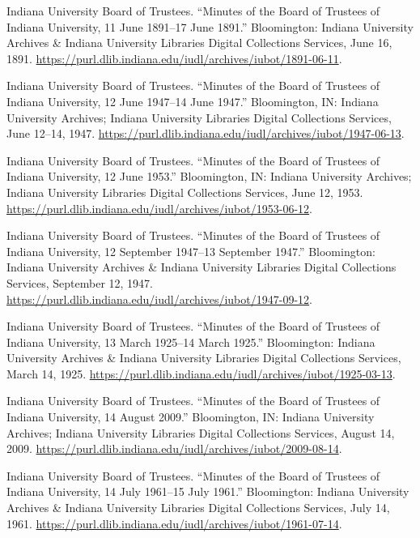 \documentclass[
  american,
  letterpaper,
]{scrreprt}
\newlength{\cslhangindent}
\newenvironment{CSLReferences}[2] %
 {\begin{list}{}{%
  \setlength{\itemindent}{0pt}
  \setlength{\leftmargin}{0pt}
  \setlength{\parsep}{0pt}
  \ifodd #1
   \setlength{\leftmargin}{\cslhangindent}
   \setlength{\itemindent}{-1\cslhangindent}
  \fi
  \setlength{\itemsep}{#2\baselineskip}}}
 {\end{list}}
\begin{document}
\begin{CSLReferences}{1}{0}
Indiana University Board of Trustees. {``Minutes of the Board of
Trustees of Indiana University, 11 June 1891--17 June 1891.''}
Bloomington: Indiana University Archives \& Indiana University Libraries
Digital Collections Services, June 16, 1891.
\url{https://purl.dlib.indiana.edu/iudl/archives/iubot/1891-06-11}.

Indiana University Board of Trustees. {``Minutes of the Board of
Trustees of Indiana University, 12 June 1947--14 June 1947.''}
Bloomington, IN: Indiana University Archives; Indiana University
Libraries Digital Collections Services, June 12--14, 1947.
\url{https://purl.dlib.indiana.edu/iudl/archives/iubot/1947-06-13}.

Indiana University Board of Trustees. {``Minutes of the Board of
Trustees of Indiana University, 12 June 1953.''} Bloomington, IN:
Indiana University Archives; Indiana University Libraries Digital
Collections Services, June 12, 1953.
\url{https://purl.dlib.indiana.edu/iudl/archives/iubot/1953-06-12}.

Indiana University Board of Trustees. {``Minutes of the Board of
Trustees of Indiana University, 12 September 1947--13 September 1947.''}
Bloomington: Indiana University Archives \& Indiana University Libraries
Digital Collections Services, September 12, 1947.
\url{https://purl.dlib.indiana.edu/iudl/archives/iubot/1947-09-12}.

Indiana University Board of Trustees. {``Minutes of the Board of
Trustees of Indiana University, 13 March 1925--14 March 1925.''}
Bloomington: Indiana University Archives \& Indiana University Libraries
Digital Collections Services, March 14, 1925.
\url{https://purl.dlib.indiana.edu/iudl/archives/iubot/1925-03-13}.

Indiana University Board of Trustees. {``Minutes of the Board of
Trustees of Indiana University, 14 August 2009.''} Bloomington, IN:
Indiana University Archives; Indiana University Libraries Digital
Collections Services, August 14, 2009.
\url{https://purl.dlib.indiana.edu/iudl/archives/iubot/2009-08-14}.

Indiana University Board of Trustees. {``Minutes of the Board of
Trustees of Indiana University, 14 July 1961--15 July 1961.''}
Bloomington: Indiana University Archives \& Indiana University Libraries
Digital Collections Services, July 14, 1961.
\url{https://purl.dlib.indiana.edu/iudl/archives/iubot/1961-07-14}.


\end{CSLReferences}
\end{document}
